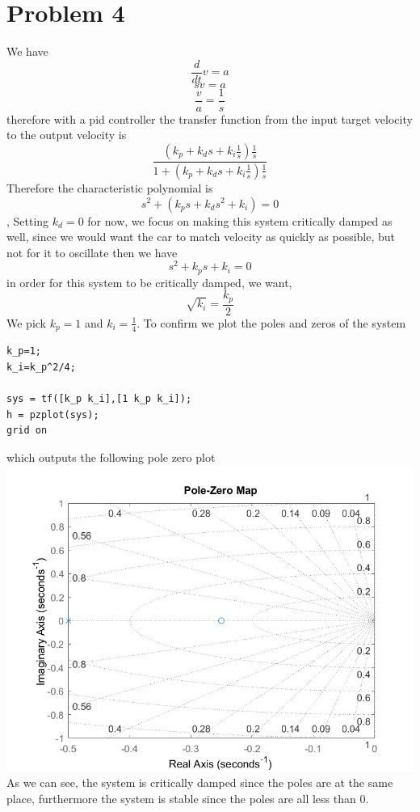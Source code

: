 \documentclass[12pt]{article}
\begin{document}
\section*{Problem 4}
We have
$$\frac{d}{dt}v=a$$
$$sv=a$$
$$\frac{v}{a}=\frac{1}{s}$$
therefore with a pid controller the transfer function from the input target velocity to the output velocity is 
$$\frac{(k_p+k_ds+k_i\frac{1}{s})\frac{1}{s}}{1+(k_p+k_ds+k_i\frac{1}{s})\frac{1}{s}}$$
Therefore the characteristic polynomial is
$$s^2+(k_ps+k_ds^2+k_i)=0$$, Setting $k_d=0$ for now, we focus on making this system critically damped as well, since we would want
the car to match velocity as quickly as possible, but not for it to oscillate
then we have
$$s^2+k_ps+k_i=0$$
in order for this system to be critically damped, we want,
$$\sqrt{k_i}=\frac{k_p}{2}$$
We pick $k_p=1$ and $k_i=\frac{1}{4}$. To confirm we plot the poles and zeros of the system
\begin{verbatim}
k_p=1;
k_i=k_p^2/4;

sys = tf([k_p k_i],[1 k_p k_i]);
h = pzplot(sys);
grid on
\end{verbatim}
which outputs the following pole zero plot\\
\includegraphics[scale=0.4]{Problem4Fig1.jpg}\\
As we can see, the system is critically damped since the poles are at the same place, furthermore the system is stable since the poles are all
less than 0.
\end{document}
